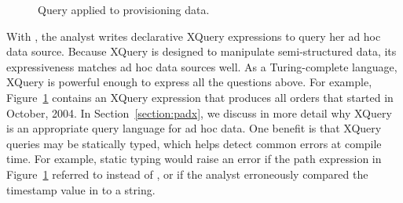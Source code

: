 \begin{figure}
\begin{small}
\end{small}
\caption{Query applied to \dibbler{} provisioning data.}
\label{figure:dibbler-query}
\end{figure}

With \padx{}, the analyst
writes declarative XQuery expressions to query her ad hoc data source.
Because XQuery is designed to manipulate semi-structured data, its
expressiveness matches ad hoc data sources well.  
As a Turing-complete language, XQuery is powerful
enough to express all the questions above.  For example,
Figure~\ref{figure:dibbler-query} contains an XQuery expression that
produces all orders that started in October, 2004.  In
Section~\ref{section:padx}, we discuss in more detail why XQuery is an appropriate
query language for ad hoc data.  One benefit is that XQuery queries may be
statically typed, which helps detect common errors at compile time.
For example, static typing would raise an error if the path expression
in Figure~\ref{figure:dibbler-query} referred to  instead
of , or if the analyst erroneously compared the timestamp
value in  to a string.

